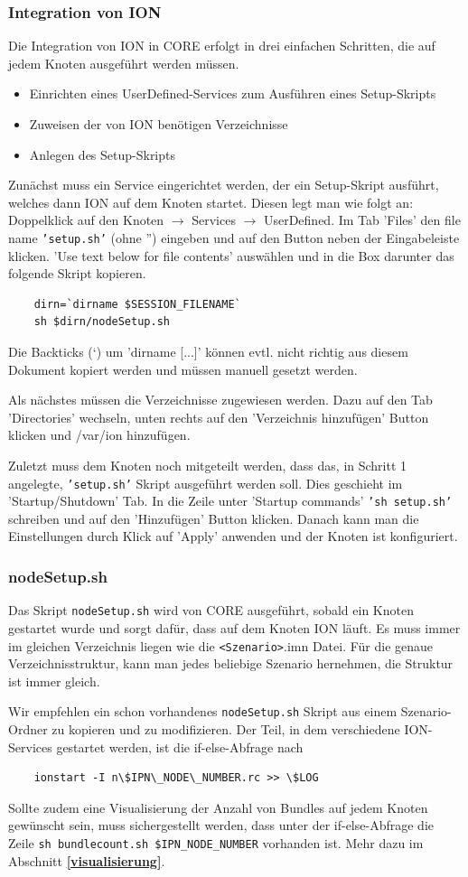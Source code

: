 \documentclass{article}
\begin{document}
\subsubsection{Integration von ION}
Die Integration von ION in CORE erfolgt in drei einfachen Schritten, die auf jedem Knoten ausgeführt werden müssen.
\begin{itemize}
\item Einrichten eines UserDefined-Services zum Ausführen eines Setup-Skripts
\item Zuweisen der von ION benötigen Verzeichnisse
\item Anlegen des Setup-Skripts
\end{itemize}\par
Zunächst muss ein Service eingerichtet werden, der ein Setup-Skript ausführt, welches dann ION auf dem Knoten startet. Diesen legt man wie folgt an: Doppelklick auf den Knoten $\rightarrow$ Services $\rightarrow$ UserDefined. Im Tab 'Files' den file name \texttt{'setup.sh'} (ohne '') eingeben und auf den Button neben der Eingabeleiste klicken. 'Use text below for file contents' auswählen und in die Box darunter das folgende Skript kopieren.
\begin{verbatim}
    dirn=`dirname $SESSION_FILENAME`
    sh $dirn/nodeSetup.sh
\end{verbatim}
Die Backticks (`) um 'dirname [...]' können evtl. nicht richtig aus diesem Dokument kopiert werden und müssen manuell gesetzt werden.\par
Als nächstes müssen die Verzeichnisse zugewiesen werden. Dazu auf den Tab 'Directories' wechseln, unten rechts auf den 'Verzeichnis hinzufügen' Button klicken und /var/ion hinzufügen.\par
Zuletzt muss dem Knoten noch mitgeteilt werden, dass das, in Schritt 1 angelegte, \texttt{'setup.sh'} Skript ausgeführt werden soll. Dies geschieht im 'Startup/Shutdown' Tab. In die Zeile unter 'Startup commands' \texttt{'sh setup.sh'} schreiben und auf den 'Hinzufügen' Button klicken. Danach kann man die Einstellungen durch Klick auf 'Apply' anwenden und der Knoten ist konfiguriert.
\subsubsection{nodeSetup.sh}
Das Skript \texttt{nodeSetup.sh} wird von CORE ausgeführt, sobald ein Knoten gestartet wurde und sorgt dafür, dass auf dem Knoten ION läuft. Es muss immer im gleichen Verzeichnis liegen wie die \texttt{<Szenario>}.imn Datei. Für die genaue Verzeichnisstruktur, kann man jedes beliebige Szenario hernehmen, die Struktur ist immer gleich.\par
Wir empfehlen ein schon vorhandenes \texttt{nodeSetup.sh} Skript aus einem Szenario-Ordner zu kopieren und zu modifizieren. Der Teil, in dem verschiedene ION-Services gestartet werden, ist die if-else-Abfrage nach
\begin{verbatim} 
    ionstart -I n\$IPN\_NODE\_NUMBER.rc >> \$LOG
\end{verbatim}
Sollte zudem eine Visualisierung der Anzahl von Bundles auf jedem Knoten gewünscht sein, muss sichergestellt werden, dass unter der if-else-Abfrage die Zeile \texttt{sh bundlecount.sh \$IPN\_NODE\_NUMBER} vorhanden ist. Mehr dazu im Abschnitt \textbf{\ref{visualisierung}}.
\end{document}
